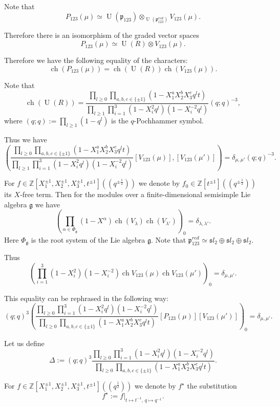 \documentclass[10pt]{amsart}
\newcommand{\fg}{{\mathfrak g}}
\newcommand{\fsl}{{\mathfrak sl}}
\newcommand{\fp}{{\mathfrak p}}
\DeclareMathOperator{\ch}{ch}
\DeclareMathOperator{\U}{U}
\begin{document}
	Note that
	\[P_{123}(\mu) \simeq \U(\fp_{123})\otimes_{\U(\fp_{123}^{red})}V_{123}(\mu).\]
	
	Therefore there is an isomorphism of the graded vector spaces
	\[P_{123}(\mu) \simeq \U(R)\otimes V_{123}(\mu).\]
	
	Therefore we have the following equality of the characters:
	\[\ch (P_{123}(\mu))=\ch( \U(R))\ch ( V_{123}(\mu)).\]
	
	Note that
	\begin{equation*}
		\ch( \U(R))=\frac{\prod_{l \geq 0}\prod_{a,b,c\in\{\pm 1\}}(1-X_1^aX_2^bX_3^c q^lt)}{\prod_{l \geq 1}\prod_{i=1}^3(1-X_i^2 q^l)(1-X_i^{-2} q^l)}(q;q)^{-3},
	\end{equation*}
	where $(q;q):=\prod_{l \geq 1}(1-q^l)$ is the $q$-Pochhammer symbol.
	
	Thus we have
	\begin{equation*}
		\left(\frac{\prod_{l \geq 0}\prod_{a,b,c\in\{\pm 1\}}(1-X_1^aX_2^bX_3^c q^lt)}{\prod_{l \geq 1}\prod_{i=1}^3(1-X_i^2 q^l)(1-X_i^{-2} q^l)}[V_{123}(\mu)],[V_{123}(\mu')]\right)=\delta_{\mu,\mu'}(q;q)^{-3}.
	\end{equation*}
	
	For $f \in \mathbb{Z}[X_1^{\pm 1},X_2^{\pm 1},X_3^{\pm 1},t^{\pm 1}]((q^{\pm \frac{1}{2}}))$ we denote by $f_0 \in \mathbb{Z}[t^{\pm 1}]((q^{\pm \frac{1}{2}}))$ its $X$-free term. Then for the modules over a finite-dimensional semisimple Lie algebra $\fg$ we have
	\[\left(\prod_{\alpha \in \Phi_{\fg}}(1-X^\alpha)\ch(V_\lambda)\ch(V_{\lambda'})\right)_0=\delta_{\lambda,\lambda'}.\]
	Here $\Phi_\fg$ is the root system of the Lie algebra $\fg$. Note that $\fp_{123}^{red}\simeq \fsl_2 \oplus \fsl_2 \oplus \fsl_2$.
	
	Thus
	\[\left(\prod_{i=1}^3(1-X_i^2)(1-X_i^{-2})\ch V_{123}(\mu)\ch V_{123}(\mu')\right)_0=\delta_{\mu,\mu'}.\]
	
	This equality can be rephrased in the following way:
	\begin{equation}\label{eq:BilinearFormOnBasis}
		(q;q)^3\left(\frac{\prod_{l \geq 0}\prod_{i=1}^3(1-X_i^2 q^l)(1-X_i^{-2} q^l)}{\prod_{l \geq 0}\prod_{a,b,c\in\{\pm 1\}}(1-X_1^aX_2^bX_3^c q^lt)}[P_{123}(\mu)][V_{123}(\mu')]\right)_0=\delta_{\mu,\mu'}.
	\end{equation}
	
	Let us define
	\[\Delta:=(q;q)^3\frac{\prod_{l \geq 0}\prod_{i=1}^3(1-X_i^2 q^l)(1-X_i^{-2} q^l)}{\prod_{l \geq 0}\prod_{a,b,c\in\{\pm 1\}}(1-X_1^aX_2^bX_3^c q^lt)}.\]
	
	For $f \in \mathbb{Z}[X_1^{\pm 1},X_2^{\pm 1},X_3^{\pm 1},t^{\pm 1}]((q^{\frac{1}{2}}))$ we denote by $f^\star$ the substitution
	\[f^\star:=f|_{t \mapsto t^{-1},\,q \mapsto q^{-1}}.\]
	
\end{document}
